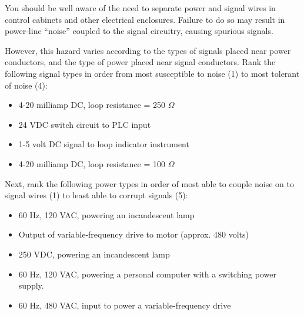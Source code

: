 

You should be well aware of the need to separate power and signal wires in control cabinets and other electrical enclosures.  Failure to do so may result in power-line ``noise'' coupled to the signal circuitry, causing spurious signals.

\vskip 10pt

However, this hazard varies according to the types of signals placed near power conductors, and the type of power placed near signal conductors.  Rank the following signal types in order from most susceptible to noise (1) to most tolerant of noise (4):

\begin{itemize}
\item{} \underbar{\hskip 20pt} 4-20 milliamp DC, loop resistance = 250 $\Omega$
\vskip 5pt 
\item{} \underbar{\hskip 20pt} 24 VDC switch circuit to PLC input
\vskip 5pt 
\item{} \underbar{\hskip 20pt} 1-5 volt DC signal to loop indicator instrument
\vskip 5pt 
\item{} \underbar{\hskip 20pt} 4-20 milliamp DC, loop resistance = 100 $\Omega$
\end{itemize}

\vskip 10pt

Next, rank the following power types in order of most able to couple noise on to signal wires (1) to least able to corrupt signals (5):

\begin{itemize}
\item{} \underbar{\hskip 20pt} 60 Hz, 120 VAC, powering an incandescent lamp
\vskip 5pt 
\item{} \underbar{\hskip 20pt} Output of variable-frequency drive to motor (approx. 480 volts)
\vskip 5pt 
\item{} \underbar{\hskip 20pt} 250 VDC, powering an incandescent lamp
\vskip 5pt 
\item{} \underbar{\hskip 20pt} 60 Hz, 120 VAC, powering a personal computer with a switching power supply.
\vskip 5pt 
\item{} \underbar{\hskip 20pt} 60 Hz, 480 VAC, input to power a variable-frequency drive
\end{itemize}

